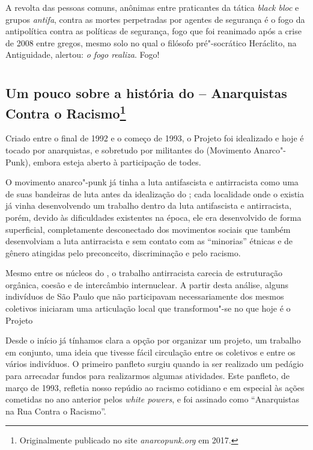A revolta das pessoas comuns, anônimas entre praticantes da tática
\emph{black bloc} e grupos \emph{antifa}, contra as mortes perpetradas
por agentes de segurança é o fogo da antipolítica contra as políticas de
segurança, fogo que foi reanimado após a crise de 2008 entre gregos,
mesmo solo no qual o filósofo pré"-socrático Heráclito, na Antiguidade,
alertou: \emph{o fogo realiza}. Fogo!


\part{}

\chapter{Um pouco sobre a história do  -- Anarquistas Contra o Racismo\footnote[*]{Originalmente publicado no site \emph{anarcopunk.org} em 2017.}}
\label{acr}

Criado entre o final de 1992 e o começo de 1993, o Projeto  foi idealizado e hoje é tocado por anarquistas, e sobretudo por militantes do  (Movimento Anarco"-Punk), embora esteja aberto à participação de todes.

O movimento anarco"-punk já tinha a luta antifascista e antirracista como uma de suas bandeiras de luta antes da idealização do ; cada localidade onde o  existia já vinha desenvolvendo um trabalho dentro da luta antifascista e antirracista, porém, devido às dificuldades existentes na época, ele era desenvolvido de forma superficial, completamente desconectado dos movimentos sociais que também desenvolviam a luta antirracista e sem contato com as ``minorias'' étnicas e de gênero atingidas pelo preconceito, discriminação e pelo racismo.

Mesmo entre os núcleos do , o trabalho antirracista carecia de estruturação orgânica, coesão e de intercâmbio internuclear. A partir desta análise, alguns indivíduos de São Paulo que não participavam necessariamente dos mesmos coletivos iniciaram uma articulação local que transformou"-se no que hoje é o Projeto 

Desde o início já tínhamos clara a opção por organizar um projeto, um trabalho em conjunto, uma ideia que tivesse fácil circulação entre os coletivos e entre os vários indivíduos. O primeiro panfleto surgiu quando ia ser realizado um pedágio para arrecadar fundos para realizarmos algumas atividades. Este panfleto, de março de 1993, refletia nosso repúdio ao racismo cotidiano e em especial às ações cometidas no ano anterior pelos \emph{white powers}, e foi assinado como ``Anarquistas na Rua Contra o Racismo''.

